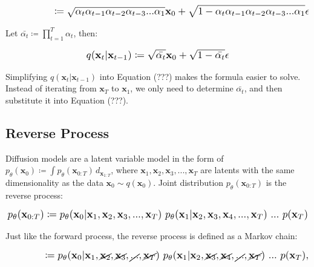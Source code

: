 \documentclass{article}
\newcommand*{\Scale}[2][4]{\scalebox{#1}{\ensuremath{#2}}}
\begin{document}
\begin{equation}
\Scale[1.2]{ \displaystyle
\hspace{4.75em} \coloneq \sqrt{\alpha_t \alpha_{t-1} \alpha_{t-2} \alpha_{t-3} ... \alpha_{1}} \textbf{x}_{0} + \sqrt{1-\alpha_t\alpha_{t-1}\alpha_{t-2}\alpha_{t-3}...\alpha_{1}} \epsilon }
\end{equation}

Let $ \bar{\alpha_t} \coloneq \displaystyle \prod_{t=1}^{T} \alpha_t $, then:

\begin{equation}
\Scale[1.2]{ \displaystyle
q(\textbf{x}_{t}|\textbf{x}_{t-1}) \coloneq \sqrt{\bar{\alpha_t}} \textbf{x}_{0} + \sqrt{1-\bar{\alpha_t}} \epsilon }
\end{equation}

Simplifying $ q(\textbf{x}_{t}|\textbf{x}_{t-1}) $ into Equation (???) makes the formula easier to solve. Instead of iterating from $ \textbf{x}_{T} $ to $ \textbf{x}_{1} $, we only need to determine $ \bar{\alpha_t} $, and then substitute it into Equation (???).

\subsection{Reverse Process}


Diffusion models are a latent variable model in the form of $ p_\theta(\textbf{x}_0) \coloneq \int p_\theta(\textbf{x}_{0:T}) \,d_{\textbf{x}_{1:T}} $, where $ \textbf{x}_1,\textbf{x}_2,\textbf{x}_3,...,\textbf{x}_T $ are latents with the same dimensionality as the data $ \textbf{x}_0 \sim q(\textbf{x}_0) $. Joint distribution $ p_\theta(\textbf{x}_{0:T}) $ is the reverse process:

\begin{equation}
\Scale[1.2]{ \displaystyle
p_\theta(\textbf{x}_{0:T}) \coloneq p_\theta(\textbf{x}_0|\textbf{x}_1,\textbf{x}_2,\textbf{x}_3,...,\textbf{x}_T) \ p_\theta(\textbf{x}_1|\textbf{x}_2,\textbf{x}_3,\textbf{x}_4,...,\textbf{x}_T) \ ... \  p(\textbf{x}_{T}) }
\end{equation}

Just like the forward process, the reverse process is defined as a Markov chain:

\begin{equation}
\Scale[1.2]{ \displaystyle
\hspace{3.75em} \coloneq p_\theta(\textbf{x}_0|\textbf{x}_1,\cancel{\textbf{x}_2},\cancel{\textbf{x}_3},\cancel{...},\cancel{\textbf{x}_T}) \ p_\theta(\textbf{x}_1|\textbf{x}_2,\cancel{\textbf{x}_3},\cancel{\textbf{x}_4},\cancel{...},\cancel{\textbf{x}_T}) \ ... \  p(\textbf{x}_{T}), }
\end{equation}
\end{document}
